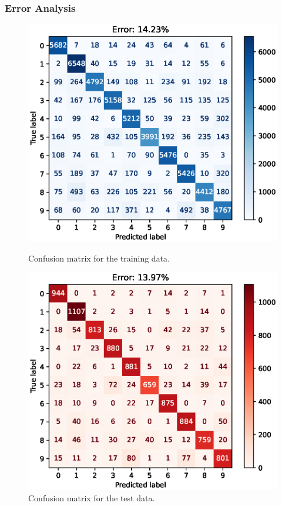 \documentclass{article}
\begin{document}
\subsubsection{Error Analysis}

\FloatBarrier

\begin{figure}[h!]
    \centering
    \begin{minipage}{0.5\textwidth}
        \centering
        \includegraphics[width=\textwidth]{images/one_vs_all_train_confusion_matrix.eps}
        \caption{Confusion matrix for the training data.}
    \end{minipage}\hfill
    \begin{minipage}{0.5\textwidth}
        \centering
        \includegraphics[width=\textwidth]{images/one_vs_all_test_confusion_matrix.eps}
        \caption{Confusion matrix for the test data.}
    \end{minipage}
\end{figure}
\end{document}

